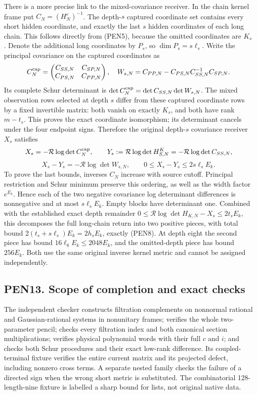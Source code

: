 \documentclass[11pt]{article}
\begin{document}
There is a more precise link to the mixed-covariance receiver. In the chain kernel frame put \(C_N=(H_N^c)^{-1}\). The depth-\(s\) captured coordinate set contains every short hidden coordinate, and exactly the last \(s\) hidden coordinates of each long chain. This follows directly from (PEN5), because the omitted coordinates are \(K_s\). Denote the additional long coordinates by \(P_s\), so \(\dim P_s=s\ell_s\). Write the principal covariance on the captured coordinates as \[
C_N^{\rm cap}=
\begin{pmatrix}C_{SS,N}&C_{SP,N}\\C_{PS,N}&C_{PP,N}\end{pmatrix},
\quad
W_{s,N}=C_{PP,N}-C_{PS,N}C_{SS,N}^{-1}C_{SP,N}.
\] Its complete Schur determinant is \(\det C_N^{\rm cap}=\det C_{SS,N}\det W_{s,N}\). The mixed observation rows selected at depth \(s\) differ from these captured coordinate rows by a fixed invertible matrix: both vanish on exactly \(K_s\), and both have rank \(m-t_s\). This proves the exact coordinate isomorphism; its determinant cancels under the four endpoint signs. Therefore the original depth-\(s\) covariance receiver \(X_s\) satisfies \[
X_s=-\mathcal R\log\det C_N^{\rm cap},\qquad
Y_s:=\mathcal R\log\det H_{S,N}^{K}
=-\mathcal R\log\det C_{SS,N},
\] \[
\boxed{X_s-Y_s=-\mathcal R\log\det W_{s,N},\qquad
0\le X_s-Y_s\le2s\ell_sE_k.} \tag{PEN27}
\] To prove the last bounds, inverses \(C_N\) increase with source cutoff. Principal restriction and Schur minimum preserve this ordering, as well as the width factor \(e^{E_k}\). Hence each of the two negative covariance log determinant differences is nonnegative and at most \(s\ell_sE_k\). Empty blocks have determinant one. Combined with the established exact depth remainder \(0\le\mathcal R\log\det H_{K,N}-X_s\le2t_sE_k\), this decomposes the full long-chain return into two positive pieces, with total bound \(2(t_s+s\ell_s)E_k=2h_sE_k\), exactly (PEN8). At depth eight the second piece has bound \(16\ell_8E_k\le2048E_k\), and the omitted-depth piece has bound \(256E_k\). Both use the same original inverse kernel metric and cannot be assigned independently.

\subsection{PEN13. Scope of completion and exact checks}\label{pen13.-scope-of-completion-and-exact-checks}

The independent checker constructs filtration complements on nonnormal rational and Gaussian-rational systems in nonunitary frames; verifies the whole two-parameter pencil; checks every filtration index and both canonical section multiplications; verifies physical polynomial words with their full \(c\) and \(i\); and checks both Schur procedures and their exact low-rank difference. Its coupled-terminal fixture verifies the entire current matrix and its projected defect, including nonzero cross terms. A separate nested family checks the failure of a directed sign when the wrong short metric is substituted. The combinatorial 128-length-nine fixture is labelled a sharp bound for lists, not original native data.
\end{document}

